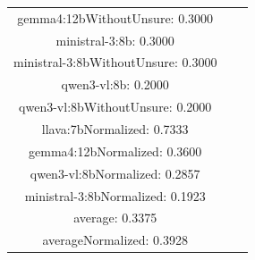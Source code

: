 \documentclass[a4paper]{article}
\begin{document}
\begin{tabular}{ccc}
gemma4:12bWithoutUnsure: 0.3000 \\ ministral-3:8b: 0.3000 \\ ministral-3:8bWithoutUnsure: 0.3000 \\ qwen3-vl:8b: 0.2000 \\ qwen3-vl:8bWithoutUnsure: 0.2000 \\ llava:7bNormalized: 0.7333 \\ gemma4:12bNormalized: 0.3600 \\ qwen3-vl:8bNormalized: 0.2857 \\ ministral-3:8bNormalized: 0.1923 \\ average: 0.3375 \\ averageNormalized: 0.3928 \end{minipage}\\
\end{tabular}

\vspace{5mm}
\end{document}
